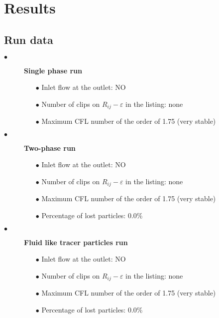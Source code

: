 \section{Results}

\subsection{Run data}

\begin{description}

   \item[$\bullet$]\textbf{Single phase run}

         \begin{itemize}
            \item[$\bullet$] Inlet flow at the outlet: NO
            \item[$\bullet$] Number of clips on $R_{ij}-\varepsilon$ in the listing: none
            \item[$\bullet$] Maximum CFL number of the order of 1.75 (very stable)
         \end{itemize}

   \item[$\bullet$]\textbf{Two-phase run}

         \begin{itemize}
            \item[$\bullet$] Inlet flow at the outlet: NO
            \item[$\bullet$] Number of clips on $R_{ij}-\varepsilon$ in the listing: none
            \item[$\bullet$] Maximum CFL number of the order of 1.75 (very stable)
            \item[$\bullet$] Percentage of lost particles: $0.0$\%
         \end{itemize}
         
   \item[$\bullet$]\textbf{Fluid like tracer particles run}

         \begin{itemize}
            \item[$\bullet$] Inlet flow at the outlet: NO
            \item[$\bullet$] Number of clips on $R_{ij}-\varepsilon$ in the listing: none
            \item[$\bullet$] Maximum CFL number of the order of 1.75 (very stable)
            \item[$\bullet$] Percentage of lost particles: $0.0$\%
         \end{itemize}


\end{description}
